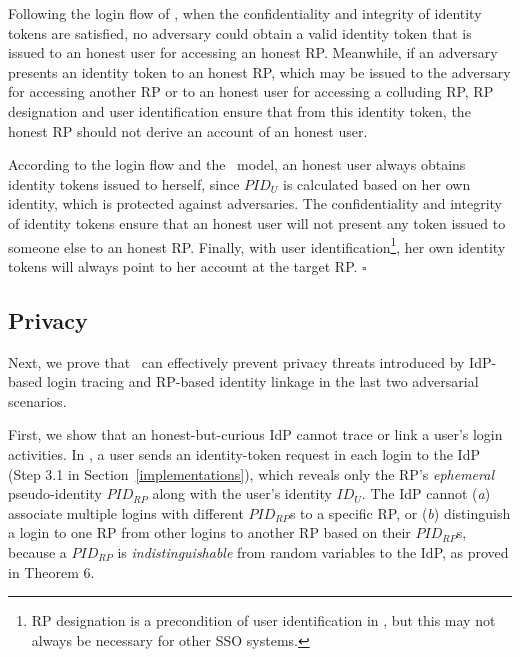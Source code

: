 Following the login flow of \usso, when the confidentiality and integrity of identity tokens are satisfied, no adversary could obtain a valid identity token that is issued to an honest user for accessing an honest RP. %
Meanwhile, if an adversary presents an identity token to an honest RP, which may be issued to the adversary for accessing another RP or to an honest user for accessing a colluding RP, RP designation and user identification ensure that from this identity token, the honest RP should not derive an account of an honest user.

According to the login flow and the \dyu~model, an honest user always obtains identity tokens issued to herself, since $PID_U$ is calculated based on her own identity, which is protected against adversaries. The confidentiality and integrity of identity tokens ensure that an honest user will not present any token issued to someone else to an honest RP. Finally, with user identification\footnote{RP designation is a precondition of user identification in \usso, but this may not always be necessary for other SSO systems.}, her own identity tokens will always point to her account at the target RP.
\hfill $\square$


\subsection{Privacy}
\label{sec-:analysis}
Next, we prove that \usso~can effectively prevent privacy threats introduced by IdP-based login tracing and RP-based identity linkage in the last two adversarial scenarios.

\newc
First, we show that an honest-but-curious IdP cannot trace or link a user's login activities. In \usso, a user sends an identity-token request in each login to the IdP (Step 3.1 in Section~\ref{implementations}), which reveals only the RP's \emph{ephemeral} pseudo-identity $PID_{RP}$ along with the user's identity $ID_U$. The IdP cannot (\emph{a}) associate multiple logins with different $PID_{RP}$s to a specific RP, or (\emph{b}) distinguish a login to one RP from other logins to another RP based on their $PID_{RP}$s, because a $PID_{RP}$ is \emph{indistinguishable} from random variables to the IdP, as proved in Theorem 6.

